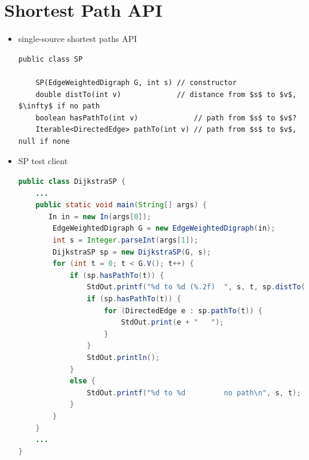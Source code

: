 \documentclass[8pt,a4paper,compress]{beamer}
\begin{document}
\section{Shortest Path API}
\begin{frame}[fragile]
\begin{itemize}
\item single-source shortest paths API
\begin{lstlisting}[language={},mathescape]
public class SP
    
    SP(EdgeWeightedDigraph G, int s) // constructor
    double distTo(int v)             // distance from $s$ to $v$, $\infty$ if no path
    boolean hasPathTo(int v)             // path from $s$ to $v$?
    Iterable<DirectedEdge> pathTo(int v) // path from $s$ to $v$, null if none
\end{lstlisting}

\item SP test client
\begin{lstlisting}[language=Java]
public class DijkstraSP {
    ...
    public static void main(String[] args) {
       In in = new In(args[0]);
        EdgeWeightedDigraph G = new EdgeWeightedDigraph(in);
        int s = Integer.parseInt(args[1]);
        DijkstraSP sp = new DijkstraSP(G, s);
        for (int t = 0; t < G.V(); t++) {
            if (sp.hasPathTo(t)) {
                StdOut.printf("%d to %d (%.2f)  ", s, t, sp.distTo(t));
                if (sp.hasPathTo(t)) {
                    for (DirectedEdge e : sp.pathTo(t)) {
                        StdOut.print(e + "   ");
                    }
                }
                StdOut.println();
            }
            else {
                StdOut.printf("%d to %d         no path\n", s, t);
            }
        }
    }
    ...
}
\end{lstlisting}
\end{itemize}
\end{frame}
\end{document}
